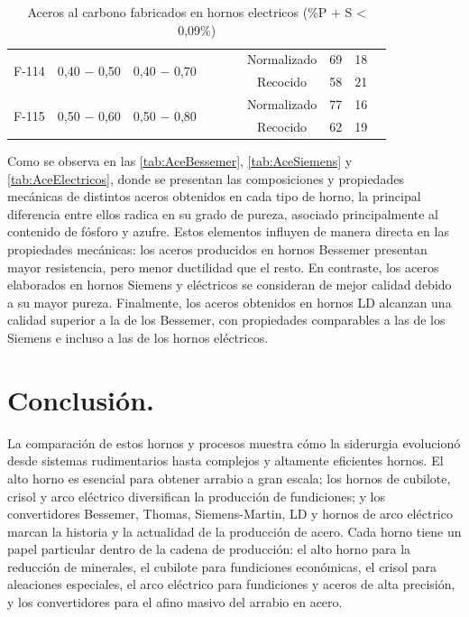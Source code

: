 \documentclass[12pt,a4paper]{article}
\begin{document}
\begin{table}[h]
{\begin{tabular}{cccccccccc}
\midrule
\multirow{2}{*}{F-114} & \multirow{2}{*}{0,40 $-$ 0,50} & \multirow{2}{*}{0,40 $-$ 0,70} &                          & & & Normalizado & 69 & 18 \\
                     &                                 &                                 &                          & & & Recocido   & 58 & 21 \\
\midrule
\multirow{2}{*}{F-115} & \multirow{2}{*}{0,50 $-$ 0,60} & \multirow{2}{*}{0,50 $-$ 0,80} &                          & & & Normalizado & 77 & 16 \\
                     &                                 &                                 &                          & & & Recocido   & 62 & 19 \\
\bottomrule
\end{tabular}%
}
\caption{Aceros al carbono fabricados en hornos electricos (\%P + S < 0,09\%)}
\label{tab:AceElectricos}
\end{table}

Como se observa en las \autoref{tab:AceBessemer}, \autoref{tab:AceSiemens} y \autoref{tab:AceElectricos}, donde se presentan las composiciones y propiedades mecánicas de distintos aceros obtenidos en cada tipo de horno, la principal diferencia entre ellos radica en su grado de pureza, asociado principalmente al contenido de fósforo y azufre. Estos elementos influyen de manera directa en las propiedades mecánicas: los aceros producidos en hornos Bessemer presentan mayor resistencia, pero menor ductilidad que el resto. En contraste, los aceros elaborados en hornos Siemens y eléctricos se consideran de mejor calidad debido a su mayor pureza. Finalmente, los aceros obtenidos en hornos LD alcanzan una calidad superior a la de los Bessemer, con propiedades comparables a las de los Siemens e incluso a las de los hornos eléctricos.

\section{Conclusión.}
La comparación de estos hornos y procesos muestra cómo la siderurgia evolucionó desde sistemas rudimentarios hasta complejos y altamente eficientes hornos. El alto horno es esencial para obtener arrabio a gran escala; los hornos de cubilote, crisol y arco eléctrico diversifican la producción de fundiciones; y los convertidores Bessemer, Thomas, Siemens-Martin, LD y hornos de arco eléctrico marcan la historia y la actualidad de la producción de acero. Cada horno tiene un papel particular dentro de la cadena de producción: el alto horno para la reducción de minerales, el cubilote para fundiciones económicas, el crisol para aleaciones especiales, el arco eléctrico para fundiciones y aceros de alta precisión, y los convertidores para el afino masivo del arrabio en acero.
\end{document}
